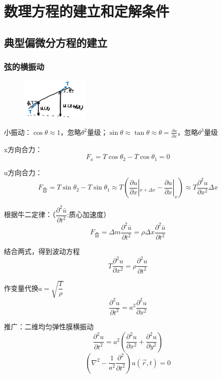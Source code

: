 \newpage
\section{数理方程的建立和定解条件}
\subsection{典型偏微分方程的建立}
\subsubsection{弦的横振动}
\begin{figure}[htbp] %
    \centering %
    \includegraphics[width=0.3\textwidth]{figures/Rope.png} %
    \label{rope} %
\end{figure}%
小振动：$\cos\theta\approx1$，忽略$\theta^2$量级；$\sin{\theta}\approx\tan{\theta}\approx\theta=
\frac{\partial{u}}{\partial{x}}$，忽略$\theta^3$量级

x方向合力：
$$F_x=T\cos{\theta_2}-T\cos{\theta_1}=0$$

u方向合力：
$$
    F_{\mbox{合}}=T\sin{\theta_2}-T\sin{\theta_1}
    \approx T\left(\frac{\partial{u}}{\partial{x}}|_{x+\Delta x}-\frac{\partial{u}}{\partial{x}}|_x\right)
    \approx T \frac{\partial^2{{u}}}{\partial{x}^2}\Delta x
$$

根据牛二定律：（$ \dfrac{\partial^2{\bar{u}}}{\partial{t}^2}$:质心加速度）
$$F_{\mbox{合}}=\Delta m\frac{\partial^2{\bar{u}}}{\partial{t}^2}=\rho\Delta x\frac{\partial^2{\bar{u}}}{\partial{t}^2}$$
$$$$

结合两式，得到波动方程
$$T \frac{\partial^2{u}}{\partial{x}^2}=\rho\frac{\partial^2{u}}{\partial{t}^2}$$

作变量代换$a=\sqrt{\dfrac{T}{\rho}}$
$$\boxed{\frac{\partial^2{u}}{\partial{t}^2}=a^2\frac{\partial^2{u}}{\partial{x}^2}}$$

推广：二维均匀弹性膜横振动
$$\frac{\partial^2{u}}{\partial{t}^2}=a^2\left(\frac{\partial^2{u}}{\partial{x}^2}+\frac{\partial^2{u}}{\partial{y}^2}\right)$$
$$\left(\nabla^2-\frac{1}{a^2}\frac{\partial^2}{\partial{t}^2}\right)u(\vec{r},t)=0$$

